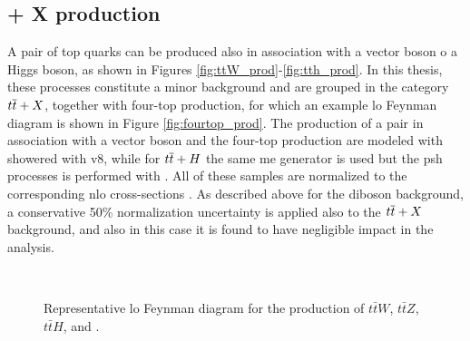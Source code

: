 \subsection{\ttbar + X production}

A pair of top quarks can be produced also in association with a vector boson o a Higgs boson, as shown in Figures \ref{fig:ttW_prod}-\ref{fig:tth_prod}.
In this thesis, these processes constitute a minor background and are grouped in the category $t\overline{t}+X$, together with four-top production,
for which an example \gls{lo} Feynman diagram is shown in Figure \ref{fig:fourtop_prod}. 
The production of a \ttbar pair in association with a vector boson and the four-top production are modeled with \aNLO showered with \PY v8, while for $t\overline{t}+H$ the same 
\gls{me} generator is used but the \gls{psh} processes is performed with \HWpp. 
All of these samples are normalized to the corresponding \gls{nlo} cross-sections \cite{Alwall:2014hca,Heinemeyer:2013tqa}.
As described above for the diboson background, a conservative 50\% normalization uncertainty is applied also to the 
$t\overline{t}+X$ background, and also in this case it is found to have negligible impact in the analysis. 

\begin{figure}[h!]
\centering 
{}
 \\
\caption{Representative \gls{lo} Feynman diagram for the production of  $t\bar{t}W$,  $t\bar{t}Z$,  $t\bar{t}H$, and  \fourtop.}\label{fig:ttX_prod}
\end{figure}

